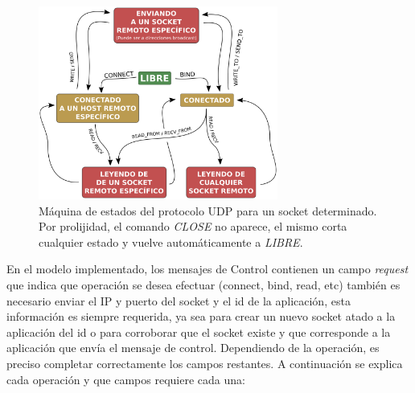 \documentclass[10pt,a4paper]{article}
\begin{document}
\begin{figure}[!hb]
    \centering
    \includegraphics[width = 0.7\textwidth]{img/png/UDP-state-machine.png}
    \caption{Máquina de estados del protocolo UDP para un socket determinado. Por prolijidad, el comando \textit{CLOSE} no aparece, el mismo corta cualquier estado y vuelve automáticamente a \textit{LIBRE}.}
    \label{figure: UPD state machine}
\end{figure}
 
En el modelo implementado, los mensajes de Control contienen un campo \textit{request} que indica que operación se desea efectuar (connect, bind, read, etc) también es necesario enviar el IP y puerto del socket y el id de la aplicación, esta información es siempre requerida, ya sea para crear un nuevo socket atado a la aplicación del id o para corroborar que el socket existe y que corresponde a la aplicación que envía el mensaje de control. Dependiendo de la operación, es preciso completar correctamente los campos restantes. A continuación se explica cada operación y que campos requiere cada una: \\
\end{document}

